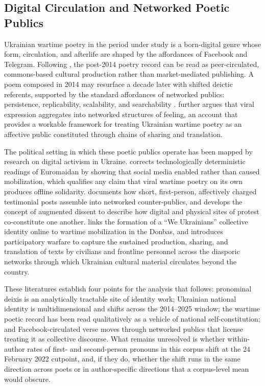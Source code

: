 \documentclass[12pt]{interact}
\theoremstyle{plain}%
\theoremstyle{definition}
\theoremstyle{remark}
\begin{document}
\subsection{Digital Circulation and Networked Poetic Publics}

Ukrainian wartime poetry in the period under study is a born-digital genre whose form, circulation, and afterlife are shaped by the affordances of Facebook and Telegram. Following \citet{benkler2018network}, the post-2014 poetry record can be read as peer-circulated, commons-based cultural production rather than market-mediated publishing. A poem composed in 2014 may resurface a decade later with shifted deictic referents, supported by the standard affordances of networked publics: persistence, replicability, scalability, and searchability \citep{papacharissi2015affective}. \citet{papacharissi2015affective} further argues that viral expression aggregates into networked structures of feeling, an account that provides a workable framework for treating Ukrainian wartime poetry as an affective public constituted through chains of sharing and translation.

The political setting in which these poetic publics operate has been mapped by research on digital activism in Ukraine. \citet{onuch2022the} corrects technologically deterministic readings of Euromaidan by showing that social media enabled rather than caused mobilization, which qualifies any claim that viral wartime poetry on its own produces offline solidarity. \citet{lokot2018iamnotafraidtosayi, lokot2021beyond} documents how short, first-person, affectively charged testimonial posts assemble into networked counter-publics, and develops the concept of augmented dissent to describe how digital and physical sites of protest co-constitute one another. \citet{boichak2020between} links the formation of a ``We Ukrainians'' collective identity online to wartime mobilization in the Donbas, and \citet{boichak2022mapping} introduces participatory warfare to capture the sustained production, sharing, and translation of texts by civilians and frontline personnel across the diasporic networks through which Ukrainian cultural material circulates beyond the country.

These literatures establish four points for the analysis that follows: pronominal deixis is an analytically tractable site of identity work; Ukrainian national identity is multidimensional and shifts across the 2014--2025 window; the wartime poetic record has been read qualitatively as a vehicle of national self-constitution; and Facebook-circulated verse moves through networked publics that license treating it as collective discourse. What remains unresolved is whether within-author rates of first- and second-person pronouns in this corpus shift at the 24 February 2022 cutpoint, and, if they do, whether the shift runs in the same direction across poets or in author-specific directions that a corpus-level mean would obscure.
\end{document}

